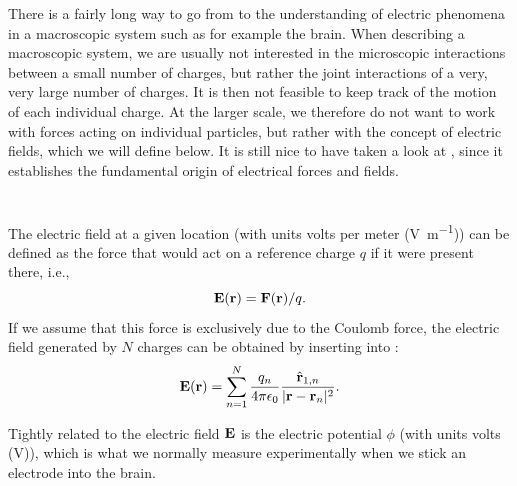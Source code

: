 There is a fairly long way to go from  to the understanding of electric phenomena in a macroscopic system such as for example the brain. When describing a macroscopic system, we are usually not interested in the microscopic interactions between a small number of charges, but rather the joint interactions of a very, very large number of charges. It is then not feasible to keep track of the motion of each individual charge. At the larger scale, we therefore do not want to work with forces acting on individual particles, but rather with the concept of electric fields, which we will define below. It is still nice to have taken a look at , since it establishes the fundamental origin of electrical forces and fields. 


\section{}
\label{sec:Basics:Fields} 

The electric field at a given location (with units volts per meter (\si{\volt\per\metre})) can be defined as the force that would act on a reference charge $q$ if it were present there, i.e., 
\begin{equation}
{\bf E}({\bf r}) = {\bf F}({\bf r})/q.
\label{eq:Basics:E}
\end{equation}
If we assume that this force is exclusively due to the Coulomb force, the electric field generated by $N$ charges can be obtained by inserting  into :
\begin{equation}
{\bf E}({\bf r}) = \sum_{n=1}^{N}  \frac{q_n}{4\pi \epsilon_0} \frac{\hat{{\bf r}}_{1,n}}{|{\bf r}-{\bf r}_n|^2}.
\label{eq:Basics:CoulombEN}
\end{equation}

Tightly related to the electric field ${\bf E}$ is the electric potential $\phi$ (with units volts (\si{\volt})), which is what we normally measure experimentally when we stick an electrode into the brain.  

